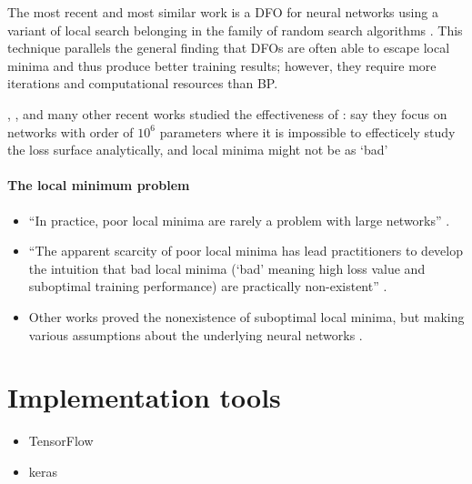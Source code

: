 The most recent and most similar work is a DFO for neural networks using a variant of local search belonging in the family of random search algorithms \cite{aly2019}.
This technique parallels the general finding that DFOs are often able to escape local minima and thus produce better training results; however, they require more iterations and computational resources than BP. 

\citeauthor{aly2019}, \citeauthor{such2017}, and many other recent works studied the effectiveness of  
\todo: say they focus on networks with order of $10^6$ parameters where it is impossible to effecticely study the loss surface analytically, and local minima might not be as `bad' 

\paragraph{The local minimum problem}
\begin{itemize}
    \item ``In practice, poor local minima are rarely a problem with large networks'' \cite{lecun2015}.
    \item ``The apparent scarcity of poor local minima has lead practitioners to develop the intuition that bad local minima (`bad' meaning high loss value and suboptimal training performance) are practically non-existent'' \cite{goldblum2019}.
    \item Other works proved the nonexistence of suboptimal local minima, but making various assumptions about the underlying neural networks \cite{kawaguchi2016,nguyen2018,laurent2018}.
\end{itemize}


\todo
\section{Implementation tools}
\begin{itemize}
    \item TensorFlow
    \item keras
\end{itemize}
\todo

